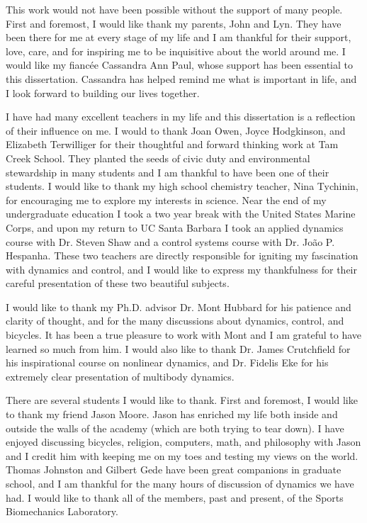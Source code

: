 This work would not have been possible without the support of many people.
First and foremost, I would like thank my parents, John and Lyn. They have been
there for me at every stage of my life and I am thankful for their support,
love, care, and for inspiring me to be inquisitive about the world around me.
I would like my fiancée Cassandra Ann Paul, whose support has been essential to
this dissertation. Cassandra has helped remind me what is important in life,
and I look forward to building our lives together.

I have had many excellent teachers in my life and this dissertation is a
reflection of their influence on me. I would to thank Joan Owen, Joyce
Hodgkinson, and Elizabeth Terwilliger for their thoughtful and forward thinking
work at Tam Creek School. They planted the seeds of civic duty and
environmental stewardship in many students and I am thankful to have been one
of their students. I would like to thank my high school chemistry teacher, Nina
Tychinin, for encouraging me to explore my interests in science. Near the end
of my undergraduate education I took a two year break with the United States
Marine Corps, and upon my return to UC Santa Barbara I took an applied dynamics
course with Dr. Steven Shaw and a control systems course with Dr. João P.
Hespanha. These two teachers are directly responsible for igniting my
fascination with dynamics and control, and I would like to express my
thankfulness for their careful presentation of these two beautiful subjects.

I would like to thank my Ph.D. advisor Dr. Mont Hubbard for his patience and
clarity of thought, and for the many discussions about dynamics, control, and
bicycles. It has been a true pleasure to work with Mont and I am grateful to
have learned so much from him. I would also like to thank Dr. James Crutchfield
for his inspirational course on nonlinear dynamics, and Dr. Fidelis Eke for his
extremely clear presentation of multibody dynamics.

There are several students I would like to thank. First and foremost, I would
like to thank my friend Jason Moore. Jason has enriched my life both inside and
outside the walls of the academy (which are both trying to tear down). I have
enjoyed discussing bicycles, religion, computers, math, and philosophy with
Jason and I credit him with keeping me on my toes and testing my views on the
world. Thomas Johnston and Gilbert Gede have been great companions in graduate
school, and I am thankful for the many hours of discussion of dynamics we have
had. I would like to thank all of the members, past and present, of the Sports
Biomechanics Laboratory.

